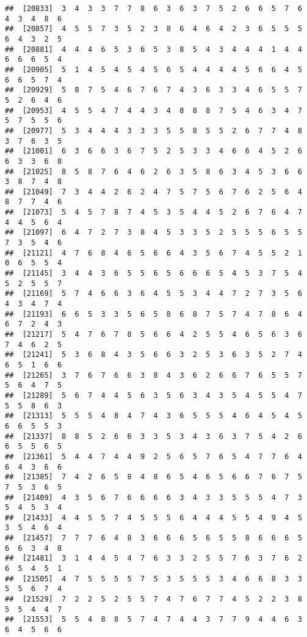 \documentclass[
]{book}
\begin{document}
\begin{verbatim}
##  [20833]  3  4  3  3  7  7  8  6  3  6  3  7  5  2  6  6  5  7  6  4  3  4  8  6
##  [20857]  4  5  5  7  3  5  2  3  8  6  4  6  4  2  3  6  5  5  5  6  4  3  2  5
##  [20881]  4  4  4  6  5  3  6  5  3  8  5  4  3  4  4  4  1  4  4  6  6  6  5  4
##  [20905]  5  1  4  5  4  5  4  5  6  5  4  4  4  4  5  6  6  4  5  6  6  5  7  4
##  [20929]  5  8  7  5  4  6  7  6  7  4  3  6  3  3  4  6  5  5  7  5  2  6  4  6
##  [20953]  4  5  5  4  7  4  4  3  4  8  8  8  7  5  4  6  3  4  7  5  7  5  5  6
##  [20977]  5  3  4  4  4  3  3  3  5  5  8  5  5  2  6  7  7  4  8  3  7  6  3  5
##  [21001]  6  3  6  6  3  6  7  5  2  5  3  3  4  6  6  4  5  2  6  6  3  3  6  8
##  [21025]  8  5  8  7  6  4  6  2  6  3  5  8  6  3  4  5  3  6  6  3  8  7  4  8
##  [21049]  7  3  4  4  2  6  2  4  7  5  7  5  6  7  6  2  5  6  4  8  7  7  4  6
##  [21073]  5  4  5  7  8  7  4  5  3  5  4  4  5  2  6  7  6  4  7  4  4  5  6  4
##  [21097]  6  4  7  2  7  3  8  4  5  3  3  5  2  5  5  5  6  5  5  7  3  5  4  6
##  [21121]  4  7  6  8  4  6  5  6  6  4  3  5  6  7  4  5  5  2  1  0  6  5  5  4
##  [21145]  3  4  4  3  6  5  5  6  5  6  6  6  5  4  5  3  7  5  4  5  2  5  5  7
##  [21169]  5  7  4  6  6  3  6  4  5  5  3  4  4  7  2  7  3  5  6  4  3  4  7  4
##  [21193]  6  6  5  3  3  5  6  5  8  6  8  7  5  7  4  7  8  6  4  6  7  2  4  3
##  [21217]  5  4  7  6  7  8  5  6  6  4  2  5  5  4  6  5  6  3  6  7  4  6  2  5
##  [21241]  5  3  6  8  4  3  5  6  6  3  2  5  3  6  3  5  2  7  4  6  5  1  6  6
##  [21265]  3  7  6  7  6  6  3  8  4  3  6  2  6  6  7  6  5  5  7  5  6  4  7  5
##  [21289]  5  6  7  4  4  5  6  3  5  6  3  4  3  5  4  5  5  4  7  5  5  8  6  3
##  [21313]  5  5  5  4  8  4  7  4  3  6  5  5  5  4  6  4  5  4  5  6  6  5  5  3
##  [21337]  8  8  5  2  6  6  3  3  5  3  4  3  6  3  7  5  4  2  6  6  5  5  6  5
##  [21361]  5  4  4  7  4  4  9  2  5  6  5  7  6  5  4  7  7  6  4  6  4  3  6  6
##  [21385]  7  4  2  6  5  8  4  8  6  5  4  6  5  6  6  7  6  7  5  7  5  3  6  5
##  [21409]  4  3  5  6  7  6  6  6  6  3  4  3  3  5  5  5  4  7  3  5  4  5  3  4
##  [21433]  4  4  5  5  7  4  5  5  5  6  4  4  4  5  5  4  9  4  5  3  5  4  6  4
##  [21457]  7  7  7  6  4  8  3  6  6  6  5  6  5  5  8  6  6  6  5  6  6  3  4  8
##  [21481]  3  1  4  4  5  4  7  6  3  3  2  5  5  7  6  3  7  6  2  6  5  4  5  1
##  [21505]  4  7  5  5  5  5  7  5  3  5  5  5  3  4  6  6  8  3  3  5  5  6  7  4
##  [21529]  7  2  2  5  2  5  5  7  4  7  6  7  7  4  5  2  2  3  8  5  5  4  4  7
##  [21553]  5  5  4  8  8  5  7  4  7  4  4  3  7  7  9  4  4  6  3  6  4  5  6  6

\end{verbatim}
\end{document}
